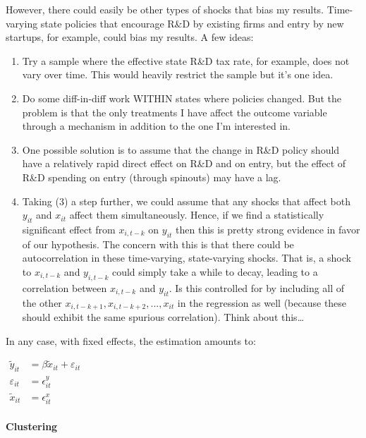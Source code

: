 \documentclass[11pt]{article}
\providecommand{\tightlist}{%
      \setlength{\itemsep}{0pt}\setlength{\parskip}{0pt}}
\begin{document}
However, there could easily be other types of shocks that bias my
results. Time-varying state policies that encourage R\&D by existing
firms and entry by new startups, for example, could bias my results. A
few ideas:

\begin{enumerate}
\def\labelenumi{\arabic{enumi}.}
\tightlist
\item
  Try a sample where the effective state R\&D tax rate, for example,
  does not vary over time. This would heavily restrict the sample but
  it's one idea.
\item
  Do some diff-in-diff work WITHIN states where policies changed. But
  the problem is that the only treatments I have affect the outcome
  variable through a mechanism in addition to the one I'm interested in.
\item
  One possible solution is to assume that the change in R\&D policy
  should have a relatively rapid direct effect on R\&D and on entry, but
  the effect of R\&D spending on entry (through spinouts) may have a
  lag.
\item
  Taking (3) a step further, we could assume that any shocks that affect
  both \(y_{it}\) and \(x_{it}\) affect them simultaneously. Hence, if
  we find a statistically significant effect from \(x_{i,t-k}\) on
  \(y_{it}\) then this is pretty strong evidence in favor of our
  hypothesis. The concern with this is that there could be
  autocorrelation in these time-varying, state-varying shocks. That is,
  a shock to \(x_{i,t-k}\) and \(y_{i,t-k}\) could simply take a while
  to decay, leading to a correlation between \(x_{i,t-k}\) and
  \(y_{it}\). Is this controlled for by including all of the other
  \(x_{i,t-k+1},x_{i,t-k+2},...,x_{it}\) in the regression as well
  (because these should exhibit the same spurious correlation). Think
  about this\ldots{}
\end{enumerate}

In any case, with fixed effects, the estimation amounts to:

\(\begin{align} \tilde{y}_{it} &= \beta \tilde{x}_{it} + \varepsilon_{it} \\ \varepsilon_{it} &= \epsilon^y_{it} \\ \tilde{x}_{it} &= \epsilon^x_{it} \end{align}\)

\hypertarget{clustering}{%
\paragraph{Clustering}\label{clustering}}
\end{document}
